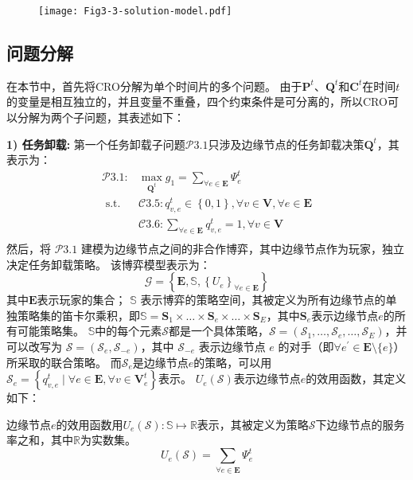 \begin{figure}[h]
\centering
  \texttt{[image: Fig3-3-solution-model.pdf]}
  \label{fig 3-3}
\end{figure} 

\subsection{问题分解}
在本节中，首先将CRO分解为单个时间片的多个问题。
由于$\mathbf{P}^{t}$、$\mathbf{Q}^{t}$和$\mathbf{C}^{t}$在时间$t$的变量是相互独立的，并且变量不重叠，四个约束条件是可分离的，所以CRO可以分解为两个子问题，其表述如下：

\textbf{1) 任务卸载:} 第一个任务卸载子问题$\mathcal{P}3.1$只涉及边缘节点的任务卸载决策$\mathbf{Q}^{t}$，其表示为：
\begin{equation}
	\begin{aligned}
		\mathcal{P}3.1: &\max_{\mathbf{Q}^{t}} g_1= \sum_{ \forall e \in \mathbf{E}} \Psi_{e}^{t}  \\
		\text { s.t. }  
		&\mathcal{C}3.5: q_{v, e}^t \in \left \{0, 1\right \}, \forall v \in \mathbf{V}, \forall e \in \mathbf{E}  \\
        &\mathcal{C}3.6: \sum_{\forall e \in \mathbf{E}} q_{v, e}^t = 1, \forall v \in \mathbf{V} \\
	\end{aligned}
\end{equation}
然后，将 $\mathcal{P}3.1$ 建模为边缘节点之间的非合作博弈，其中边缘节点作为玩家，独立决定任务卸载策略。
该博弈模型表示为：
\begin{equation}
	\mathcal{G} = \left\{\mathbf{E}, \mathbb{S}, \left\{{U}_{e}\right\}_{\forall e \in \mathbf{E}} \right\}
\end{equation}
其中$\mathbf{E}$表示玩家的集合；
$\mathbb{S}$ 表示博弈的策略空间，其被定义为所有边缘节点的单独策略集的笛卡尔乘积，即$\mathbb{S} = \mathbf{S}_{1} \times \ldots \times \mathbf{S}_{e} \times \ldots \times \mathbf{S}_{E}$，其中$\mathbf{S}_{e}$表示边缘节点$e$的所有可能策略集。
$\mathbb{S}$中的每个元素$\mathcal{S}$都是一个具体策略，$\mathcal{S} = \left(\mathcal{S}_{1}, \ldots, \mathcal{S}_{e}, \ldots, \mathcal{S}_{E} \right)$，并可以改写为 $\mathcal{S}=\left( \mathcal{S}_{e}, \mathcal{S}_{-e}\right)$，其中 $\mathcal{S}_{-e}$ 表示边缘节点 $e$ 的对手（即$\forall e^{\prime} \in \mathbf{E} \setminus \{e\}$）所采取的联合策略。
而$\mathcal{S}_{e}$是边缘节点$e$的策略，可以用$\mathcal{S}_{e} = \left\{ q_{v, e}^t \mid \forall e \in \mathbf{E}, \forall v \in \mathbf{V}_{e}^{t} \right\}$表示。
${U}_{e}\left(\mathcal{S}\right)$表示边缘节点$e$的效用函数，其定义如下：
\begin{definition}
边缘节点$e$的效用函数用${U}_{e}\left(\mathcal{S}\right): \mathbb{S} \mapsto \mathbb{R}$表示，其被定义为策略$\mathcal{S}$下边缘节点的服务率之和，其中$\mathbb{R}$为实数集。
	\begin{equation}
		{U}_{e}\left(\mathcal{S}\right) = \sum_{\forall e \in \mathbf{E}} \Psi_{e}^{t}
	\end{equation}
\end{definition}

